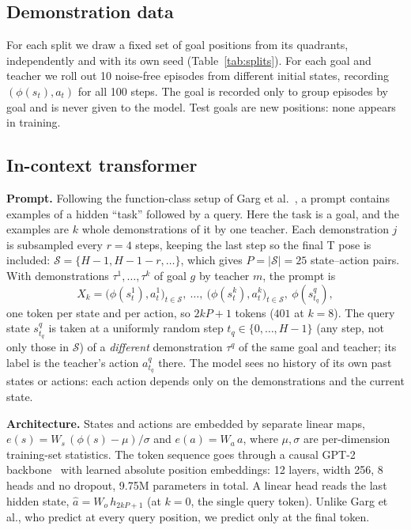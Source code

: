 \subsection{Demonstration data}
\label{sec:data}
For each split we draw a fixed set of goal positions from its quadrants, independently and with its own seed
(Table~\ref{tab:splits}). For each goal and teacher we roll out 10 noise-free episodes from different initial states, recording
$(\phi(s_t), a_t)$ for all 100 steps. The goal is recorded only to group episodes by goal and is never given to the model.
Test goals are new positions: none appears in training.

\subsection{In-context transformer}
\label{sec:icl-model}

\textbf{Prompt.} Following the function-class setup of Garg et al.~\cite{garg2022can}, a prompt contains examples of a hidden
``task'' followed by a query. Here the task is a goal, and the examples are $k$ whole demonstrations of it by one teacher.
Each demonstration $j$ is subsampled every $r = 4$ steps, keeping the last step so the final T pose is included:
$\mathcal{S} = \{H-1, H-1-r, \dots\}$, which gives $P = |\mathcal{S}| = 25$ state--action pairs. With demonstrations
$\tau^1,\dots,\tau^k$ of goal $g$ by teacher $m$, the prompt is
\begin{equation}
  X_k = \big(\phi(s^1_{t}), a^1_{t}\big)_{t \in \mathcal{S}},\ \dots,\ \big(\phi(s^k_{t}), a^k_{t}\big)_{t \in \mathcal{S}},\ \phi(s^q_{t_q}),
  \label{eq:prompt}
\end{equation}
one token per state and per action, so $2kP + 1$ tokens ($401$ at $k = 8$). The query state $s^q_{t_q}$ is taken at a uniformly
random step $t_q \in \{0,\dots,H-1\}$ (any step, not only those in $\mathcal{S}$) of a \emph{different} demonstration $\tau^q$ of the
same goal and teacher; its label is the teacher's action $a^q_{t_q}$ there. The model sees no history of its own past states or
actions: each action depends only on the demonstrations and the current state.

\textbf{Architecture.} States and actions are embedded by separate linear maps,
$e(s) = W_s\,(\phi(s) - \mu)/\sigma$ and $e(a) = W_a\,a$, where $\mu, \sigma$ are per-dimension training-set statistics. The token
sequence goes through a causal GPT-2 backbone~\cite{radford2019gpt2} with learned absolute position embeddings: 12 layers, width 256,
8 heads and no dropout, 9.75M parameters in total. A linear head reads the last hidden state,
$\hat a = W_o\, h_{2kP+1}$ (at $k = 0$, the single query token). Unlike Garg et al., who predict at every query position, we
predict only at the final token.

